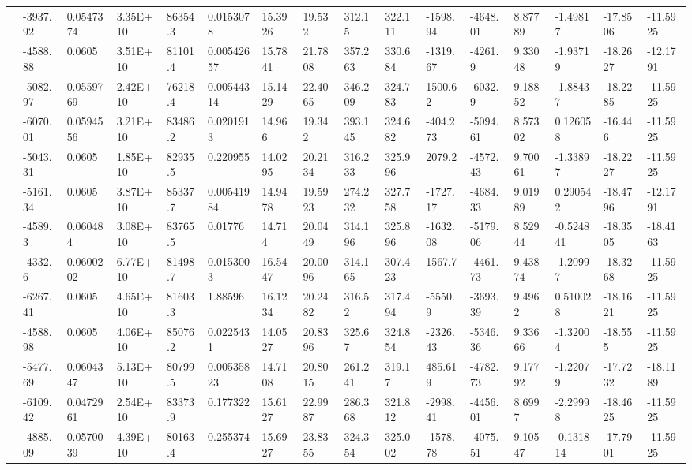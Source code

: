 \documentclass[paper=a4, fontsize=11pt]{scrartcl}
\numberwithin{equation}{section}
\numberwithin{figure}{section}
\numberwithin{table}{section}
\begin{document}
{{\begin{tabular}{l || l | l | l | l | l | l | l | l | l | l | l | l | l | l | l}
    & -3937.92 & 0.0547374 & 3.35E+10 & 86354.3 & 0.0153078 & 15.3926 & 19.532 & 312.15 & 322.111 & -1598.94 & -4648.01 & 8.87789 & -1.49817 & -17.8506 & -11.5925 \\
    & -4588.88 & 0.0605 & 3.51E+10 & 81101.4 & 0.00542657 & 15.7841 & 21.7808 & 357.263 & 330.684 & -1319.67 & -4261.9 & 9.33048 & -1.93719 & -18.2627 & -12.1791 \\
    & -5082.97 & 0.0559769 & 2.42E+10 & 76218.4 & 0.00544314 & 15.1429 & 22.4065 & 346.209 & 324.783 & 1500.62 & -6032.9 & 9.18852 & -1.88437 & -18.2285 & -11.5925 \\
    & -6070.01 & 0.0594556 & 3.21E+10 & 83486.2 & 0.0201913 & 14.966 & 19.342 & 393.145 & 324.682 & -404.273 & -5094.61 & 8.57302 & 0.126058 & -16.446 & -11.5925 \\
    & -5043.31 & 0.0605 & 1.85E+10 & 82935.5 & 0.220955 & 14.0295 & 20.2134 & 316.233 & 325.996 & 2079.2 & -4572.43 & 9.70061 & -1.33897 & -18.2227 & -11.5925 \\
    & -5161.34 & 0.0605 & 3.87E+10 & 85337.7 & 0.00541984 & 14.9478 & 19.5923 & 274.232 & 327.758 & -1727.17 & -4684.33 & 9.01989 & 0.290542 & -18.4796 & -12.1791 \\
    & -4589.3 & 0.060484 & 3.08E+10 & 83765.5 & 0.01776 & 14.714 & 20.0449 & 314.196 & 325.896 & -1632.08 & -5179.06 & 8.52944 & -0.524841 & -18.3505 & -18.4163 \\
    & -4332.6 & 0.0600202 & 6.77E+10 & 81498.7 & 0.0153003 & 16.5447 & 20.0096 & 314.165 & 307.423 & 1567.7 & -4461.73 & 9.43874 & -1.20997 & -18.3268 & -11.5925 \\
    & -6267.41 & 0.0605 & 4.65E+10 & 81603.3 & 1.88596 & 16.1234 & 20.2482 & 316.52 & 317.494 & -5550.9 & -3693.39 & 9.4962 & 0.510028 & -18.1621 & -11.5925 \\
    & -4588.98 & 0.0605 & 4.06E+10 & 85076.2 & 0.0225431 & 14.0527 & 20.8396 & 325.67 & 324.854 & -2326.43 & -5346.36 & 9.33666 & -1.32004 & -18.555 & -11.5925 \\
    & -5477.69 & 0.0604347 & 5.13E+10 & 80799.5 & 0.00535823 & 14.7108 & 20.8015 & 261.241 & 319.17 & 485.619 & -4782.73 & 9.17792 & -1.22079 & -17.7232 & -18.1189 \\
    & -6109.42 & 0.0472961 & 2.54E+10 & 83373.9 & 0.177322 & 15.6127 & 22.9987 & 286.368 & 321.812 & -2998.41 & -4456.01 & 8.6997 & -2.29998 & -18.4625 & -11.5925 \\
    & -4885.09 & 0.0570039 & 4.39E+10 & 80163.4 & 0.255374 & 15.6927 & 23.8355 & 324.354 & 325.002 & -1578.78 & -4075.51 & 9.10547 & -0.131814 & -17.7901 & -11.5925 \\

\end{tabular}}}
\end{document}
